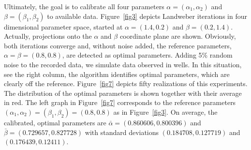Ultimately, the goal is to calibrate all four parameters $\alpha =
(\alpha_1, \alpha_2)$ and $\beta = (\beta_1, \beta_2)$ to available
data.  Figure~\ref{fig3} depicts Landweber iterations in four
dimensional parameter space, started at $\alpha=(1.4, 0.2)$ and
$\beta=(0.2, 1.4)$.  Actually, projections onto the $\alpha$ and
$\beta$ coordinate plane are shown.  Obviously, both iterations
converge and, without noise added, the reference parameters, $\alpha
= \beta = (0.8, 0.8)$, are detected as optimal parameters.  Adding 5\%
random noise to the recorded data, we simulate data observed in wells.
In this situation, see the right column, the algorithm identifies
optimal parameters, which are clearly off the reference.
Figure~\ref{fig7} depicts fifty realizations of this experiments.  The
distribution of the optimal parameters is shown together with their
average in red.  The left graph in Figure~\ref{fig7} corresponds to the
reference parameters
$(\alpha_1, \alpha_2)=(\beta_1, \beta_2)=(0.8,0.8)$ as in
Figure~\ref{fig3}.  On average, the calibrated, optimal parameters are
$\bar\alpha=(0.860606, 0.800396)$ and $\bar\beta=(0.729657, 0.827728)$
with standard deviations $(0.184708, 0.127719)$ and $(0.176439,
0.12411)$.

